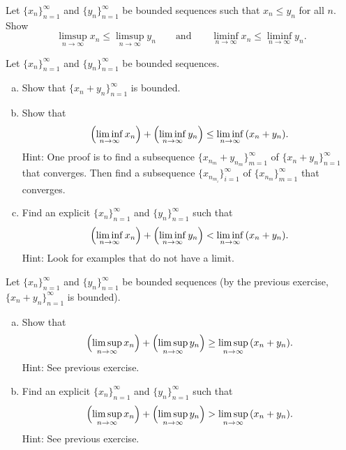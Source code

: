 \begin{exercise}
Let $\{ x_n \}_{n=1}^\infty$ and $\{ y_n \}_{n=1}^\infty$ be bounded sequences such that
$x_n \leq y_n$ for all $n$.  Show
\begin{equation*}
\limsup_{n\to\infty} x_n \leq
\limsup_{n\to\infty} y_n
\qquad \text{and} \qquad
\liminf_{n\to\infty} x_n \leq
\liminf_{n\to\infty} y_n .
\end{equation*}
\end{exercise}

\begin{exercise}
Let $\{ x_n \}_{n=1}^\infty$ and $\{ y_n \}_{n=1}^\infty$ be bounded sequences.
\begin{enumerate}[a)]
\item
Show that $\{ x_n + y_n \}_{n=1}^\infty$ is bounded.
\item
Show that
\begin{equation*}
\Bigl(\liminf_{n\to \infty} x_n\Bigr)
+
\Bigl(\liminf_{n\to \infty} y_n\Bigr)
\leq
\liminf_{n\to \infty} \, (x_n+y_n) .
\end{equation*}
Hint: One proof is to find a subsequence $\{ x_{n_m}+y_{n_m} \}_{m=1}^\infty$ of
$\{ x_n + y_n \}_{n=1}^\infty$ that converges.
Then find a subsequence $\{ x_{n_{m_i}} \}_{i=1}^\infty$ of
$\{ x_{n_m} \}_{m=1}^\infty$ that converges.
\item
Find an explicit $\{ x_n \}_{n=1}^\infty$ and $\{ y_n \}_{n=1}^\infty$ such that
\begin{equation*}
\Bigl(\liminf_{n\to \infty} x_n\Bigr)
+
\Bigl(\liminf_{n\to \infty} y_n\Bigr)
<
\liminf_{n\to \infty} \, (x_n+y_n) .
\end{equation*}
Hint: Look for examples that do not have a limit.
\end{enumerate}
\end{exercise}

\begin{samepage}
\begin{exercise}
Let $\{ x_n \}_{n=1}^\infty$ and $\{ y_n \}_{n=1}^\infty$ be bounded sequences (by the previous
exercise, $\{ x_n + y_n \}_{n=1}^\infty$ is bounded).
\begin{enumerate}[a)]
\item
Show that
\begin{equation*}
\Bigl(\limsup_{n\to \infty} x_n\Bigr)
+
\Bigl(\limsup_{n\to \infty} y_n\Bigr)
\geq
\limsup_{n\to \infty} \, (x_n+y_n) .
\end{equation*}
Hint: See previous exercise.
\item
Find an explicit $\{ x_n \}_{n=1}^\infty$ and $\{ y_n \}_{n=1}^\infty$ such that
\begin{equation*}
\Bigl(\limsup_{n\to \infty} x_n\Bigr)
+
\Bigl(\limsup_{n\to \infty} y_n\Bigr)
>
\limsup_{n\to \infty} \, (x_n+y_n) .
\end{equation*}
Hint: See previous exercise.
\end{enumerate}
\end{exercise}
\end{samepage}

